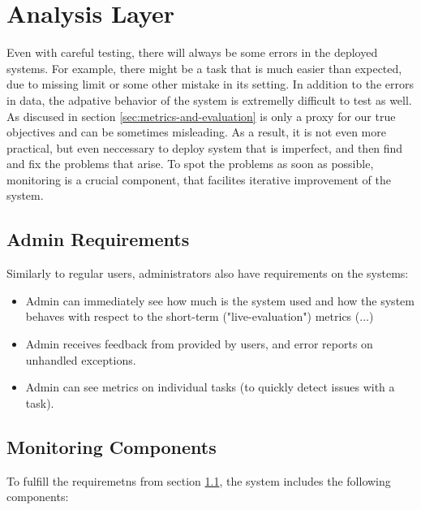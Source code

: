 


\section{Analysis Layer}
\label{sec:robomission.analysis-layer}

Even with careful testing, there will always be some errors in the deployed systems.
For example, there might be a task that is much easier than expected,
due to missing limit or some other mistake in its setting.
In addition to the errors in data,  %
the adpative behavior of the system is extremelly difficult to test as well.
As discused in section \ref{sec:metrics-and-evaluation} is only a proxy for our true objectives
and can be sometimes misleading.
As a result, it is not even more practical, but even neccessary to deploy system
that is imperfect, and then find and fix the problems that arise.
To spot the problems as soon as possible,
monitoring is a crucial component,
that facilites iterative improvement of the system.

\subsection{Admin Requirements}
\label{sec:admin-requirements}

Similarly to regular users, administrators also have requirements on the systems:

\begin{itemize}
\item Admin can immediately see how much is the system used and how the system behaves with respect to the short-term ("live-evaluation") metrics (...)
\item Admin receives feedback from provided by users, and error reports on unhandled exceptions.
\item Admin can see metrics on individual tasks (to quickly detect issues with a task).
\end{itemize}


\subsection{Monitoring Components}

To fulfill the requiremetns from section \ref{sec:admin-requirements},
the system includes the following components:

